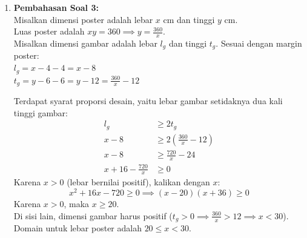 \documentclass[11pt,openany,a4paper]{article}
\begin{document}
\begin{enumerate}
\begin{enumerate}
\begin{itemize}
                  \item $g \circ f$: \\
                        $(g \circ f)(x) = g(f(x)) = \sqrt{\frac{2x-1}{x+2} - 1} = \sqrt{\frac{x-3}{x+2}}$. \\
                        Domain $g \circ f$: $x \in D_f \land f(x) \in D_g$. \\
                        $x \ne -2 \land \frac{2x-1}{x+2} \ge 1 \implies \frac{x-3}{x+2} \ge 0$. \\
                        Pembuat nol pembilang dan penyebut adalah $x = 3$ dan $x = -2$. \\
                        Melalui uji garis bilangan, penyelesaiannya adalah $x < -2$ atau $x \ge 3$. \\
                        $D_{g \circ f} = (-\infty, -2) \cup [3, \infty)$.
                \end{itemize}
        \end{enumerate}

  \item \textbf{Pembahasan Soal 3:} \\
        Misalkan dimensi poster adalah lebar $x$ cm dan tinggi $y$ cm. \\
        Luas poster adalah $xy = 360 \implies y = \frac{360}{x}$. \\
        Misalkan dimensi gambar adalah lebar $l_g$ dan tinggi $t_g$.
        Sesuai dengan margin poster: \\
        $l_g = x - 4 - 4 = x - 8$ \\
        $t_g = y - 6 - 6 = y - 12 = \frac{360}{x} - 12$

        Terdapat syarat proporsi desain, yaitu lebar gambar setidaknya dua kali tinggi gambar:
        \begin{align*}
          l_g                    & \ge 2t_g                                \\
          x - 8                  & \ge 2 \left( \frac{360}{x} - 12 \right) \\
          x - 8                  & \ge \frac{720}{x} - 24                  \\
          x + 16 - \frac{720}{x} & \ge 0
        \end{align*}
        Karena $x > 0$ (lebar bernilai positif), kalikan dengan $x$:
        \[
          x^2 + 16x - 720 \ge 0 \implies (x - 20)(x + 36) \ge 0
        \]
        Karena $x > 0$, maka $x \ge 20$. \\
        Di sisi lain, dimensi gambar harus positif ($t_g > 0 \implies \frac{360}{x} > 12 \implies x < 30$). \\
        Domain untuk lebar poster adalah $20 \le x < 30$.


\end{enumerate}
\end{document}
